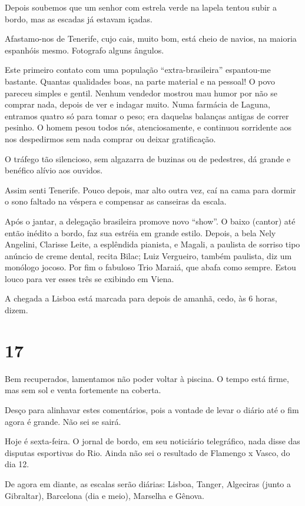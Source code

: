 Depois soubemos que um senhor com estrela verde na lapela tentou subir a bordo, mas as escadas já estavam içadas.

Afastamo-nos de Tenerife, cujo cais, muito bom, está cheio de navios, na maioria espanhóis mesmo. Fotografo alguns ângulos.

Este primeiro contato com uma população ``extra-brasileira'' espantou-me bastante. Quantas qualidades boas, na parte material e na pessoal! O povo pareceu simples e gentil. Nenhum vendedor mostrou mau humor por não se comprar nada, depois de ver e indagar muito. Numa farmácia de Laguna, entramos quatro só para tomar o peso; era daquelas balanças antigas de correr pesinho. O homem pesou todos nós, atenciosamente, e continuou sorridente aos nos despedirmos sem nada comprar ou deixar gratificação.

O tráfego tão silencioso, sem algazarra de buzinas ou de pedestres, dá grande e benéfico alívio aos ouvidos.

Assim senti Tenerife. Pouco depois, mar alto outra vez, caí na cama para dormir o sono faltado na véspera e compensar as canseiras da escala.

Após o jantar, a delegação brasileira promove novo ``show''. O baixo (cantor) até então inédito a bordo, faz sua estréia em grande estilo. Depois, a bela Nely Angelini, Clarisse Leite, a esplêndida pianista, e Magali, a paulista de sorriso tipo anúncio de creme dental, recita Bilac; Luiz Vergueiro, também paulista, diz um monólogo jocoso. Por fim o fabuloso Trio Maraiá, que abafa como sempre. Estou louco para ver esses três se exibindo em Viena.

A chegada a Lisboa está marcada para depois de amanhã, cedo, às 6 horas, dizem.

\section*{17 \adfflatleafright {}}

Bem recuperados, lamentamos não poder voltar à piscina. O tempo está firme, mas sem sol e venta fortemente na coberta.

Desço para alinhavar estes comentários, pois a vontade de levar o diário até o fim agora é grande. Não sei se sairá.

Hoje é sexta-feira. O jornal de bordo, em seu noticiário telegráfico, nada disse das disputas esportivas do Rio. Ainda não sei o resultado de Flamengo x Vasco, do dia 12.

De agora em diante, as escalas serão diárias: Lisboa, Tanger, Algeciras (junto a Gibraltar), Barcelona (dia e meio), Marselha e Gênova.


